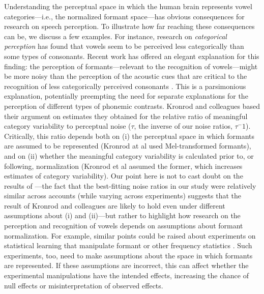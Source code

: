 \documentclass[preprint]{JASA}
\begin{document}
Understanding the perceptual space in which the human brain represents vowel categories---i.e., the normalized formant space---has obvious consequences for research on speech perception. To illustrate how far reaching these consequences can be, we discuss a few examples. For instance, research on \emph{categorical perception} has found that vowels seem to be perceived less categorically than some types of consonants. Recent work has offered an elegant explanation for this finding: the perception of formants---relevant to the recognition of vowels---might be more noisy than the perception of the acoustic cues that are critical to the recognition of less categorically perceived consonants \citep{kronrod2016}. This is a parsimonious explanation, potentially preempting the need for separate explanations for the perception of different types of phonemic contrasts. Kronrod and colleagues based their argument on estimates they obtained for the relative ratio of meaningful category variability to perceptual noise (\(\tau\), the inverse of our noise ratios, \(\tau^-1\)). Critically, this ratio depends both on (i) the perceptual space in which formants are assumed to be represented (Kronrod at al used Mel-transformed formants), and on (ii) whether the meaningful category variability is calculated prior to, or following, normalization (Kronrod et al assumed the former, which increases estimates of category variability). Our point here is not to cast doubt on the results of \citet{kronrod2016} ---the fact that the best-fitting noise ratios in our study were relatively similar across accounts (while varying across experiments) suggests that the result of Kronrod and colleagues are likely to hold even under different assumptions about (i) and (ii)---but rather to highlight how research on the perception and recognition of vowels depends on assumptions about formant normalization. For example, similar points could be raised about experiments on statistical learning that manipulate formant or other frequency statistics \citep[e.g.,][]{chladkova2017, colby2018, xie2021, wade2007}. Such experiments, too, need to make assumptions about the space in which formants are represented. If these assumptions are incorrect, this can affect whether the experimental manipulations have the intended effects, increasing the chance of null effects or misinterpretation of observed effects.
\end{document}
